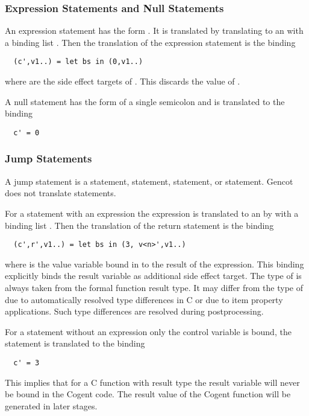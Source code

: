 \subsubsection{Expression Statements and Null Statements}

An expression statement has the form . It is translated by translating  to an  with
a binding list . Then the translation of the expression statement is the binding
\begin{verbatim}
  (c',v1..) = let bs in (0,v1..)
\end{verbatim}
where  are the side effect targets of . This discards the value  of .

A null statement has the form of a single semicolon \code{;} and is translated to the
binding
\begin{verbatim}
  c' = 0
\end{verbatim}

\subsubsection{Jump Statements}

A jump statement is a  statement,  statement,  statement, or  statement.
Gencot does not translate  statements.

For a  statement with an expression the expression is translated to an  by  with
a binding list . Then the translation of the return statement is the binding
\begin{verbatim}
  (c',r',v1..) = let bs in (3, v<n>',v1..)
\end{verbatim}
where  is the value variable bound in  to the result of the expression. This binding explicitly
binds the result variable  as additional side effect target. The type of  is always
taken from the formal function result type. It may differ from the type of  due to automatically resolved
type differences in C or due to item property applications. Such type differences are resolved during postprocessing.

For a  statement without an expression only the control variable is bound, the statement is translated to the 
binding
\begin{verbatim}
  c' = 3
\end{verbatim}
This implies that for a C function with result type  the result variable will never be bound in
the Cogent code. The result value of the Cogent function will be generated in later stages.

